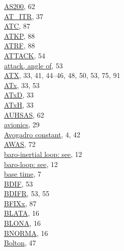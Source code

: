 \documentclass[
]{article}
\begin{document}
\href{./5-cloud-physics-variables.html\#CRPC}{AS200}, 62\\
\href{./4-the-state-of-the-atmosphere.html\#AT=ITR}{AT\_ITR}, 37\\
\href{./10-obsolete-variables.html\#atc}{ATC}, 87\\
\href{./10-obsolete-variables.html\#atkp}{ATKP}, 88\\
\href{./10-obsolete-variables.html\#atrf}{ATRF}, 88\\
\href{./4-the-state-of-the-atmosphere.html\#attack}{ATTACK}, 54\\
\href{./4-the-state-of-the-atmosphere.html\#attack}{attack, angle of},
53\\
\href{./4-the-state-of-the-atmosphere.html\#ambient-t}{ATX}, 33, 41,
44--46, 48, 50, 53, 75, 91\\
\href{./4-the-state-of-the-atmosphere.html\#ambient-t}{ATx}, 33, 53\\
\href{./4-the-state-of-the-atmosphere.html\#ambient-t}{ATxD}, 33\\
\href{./4-the-state-of-the-atmosphere.html\#ambient-t}{ATxH}, 33\\
\href{./5-cloud-physics-variables.html\#CRPC}{AUHSAS}, 62\\
\href{./4-the-state-of-the-atmosphere.html\#psx}{avionics}, 29\\
\href{./1-introduction.html\#constants-and-symbols}{Avogadro constant},
4, 42\\
\href{./6-air-chemistry-measurements.html\#awas-cims-qcls-toga}{AWAS},
72\\
\href{./3-the-state-of-the-aircraft.html\#wp3}{baro-inertial loop: see},
12\\
\href{./3-the-state-of-the-aircraft.html\#wp3}{baro-loop: see}, 12\\
\href{./2-general-information-about-data-files.html\#base-time}{base
time}, 7\\
\href{./4-the-state-of-the-atmosphere.html\#bdifr}{BDIF}, 53\\
\href{./4-the-state-of-the-atmosphere.html\#bdifr}{BDIFR}, 53, 55\\
\href{./10-obsolete-variables.html\#vanes}{BFIXx}, 87\\
\href{./3-the-state-of-the-aircraft.html\#blata}{BLATA}, 16\\
\href{./3-the-state-of-the-aircraft.html\#blona}{BLONA}, 16\\
\href{./3-the-state-of-the-aircraft.html\#bnorma}{BNORMA}, 16\\
\href{./3-the-state-of-the-aircraft.html\#thetae}{Bolton}, 47\\
\end{document}

